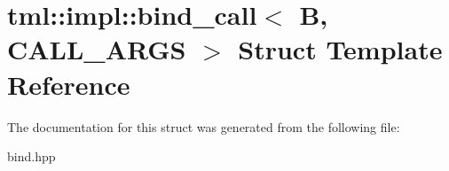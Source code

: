 \hypertarget{structtml_1_1impl_1_1bind__call}{\section{tml\+:\+:impl\+:\+:bind\+\_\+call$<$ B, C\+A\+L\+L\+\_\+\+A\+R\+G\+S $>$ Struct Template Reference}
\label{structtml_1_1impl_1_1bind__call}
}


The documentation for this struct was generated from the following file\+:\begin{DoxyCompactItemize}
\item 
bind.\+hpp\end{DoxyCompactItemize}
